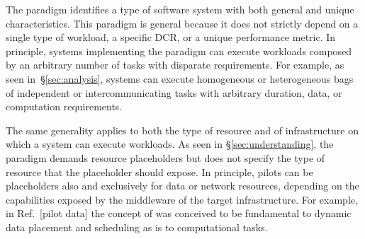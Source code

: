 \documentclass{sig-alternate}
\begin{document}

The \pilot paradigm identifies a type of software system with both general and
unique characteristics. This paradigm is general because it does not strictly
depend on a single type of workload, a specific DCR, or a unique performance
metric. In principle, systems implementing the \pilot paradigm can execute
workloads composed by an arbitrary number of tasks with disparate requirements.
For example, as seen in~\S\ref{sec:analysis}, \pilot systems can execute
homogeneous or heterogeneous bags of independent or intercommunicating tasks
with arbitrary duration, data, or computation requirements.

The same generality applies to both the type of resource and of infrastructure
on which a \pilot system can execute workloads. As seen in
\S\ref{sec:understanding}, the \pilot paradigm demands resource placeholders but
does not specify the type of resource that the placeholder should expose.
In principle, pilots can be placeholders also and exclusively for data or
network resources, depending on the capabilities exposed by the middleware of
the target infrastructure.  For example, in Ref.~[pilot data] the concept of
\pilotdata was conceived to be fundamental to dynamic data placement and
scheduling as \pilot is to computational tasks.
\end{document}
